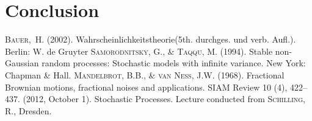 \documentclass[a4paper, twoside, 11pt]{article}
\theoremstyle{definition}
\begin{document}
\newpage

\section{Conclusion}

\newpage

\fancyhead[LO, RE]{}
\begin{thebibliography}{99}
	 \textsc{Bauer,~H.} (2002). Wahrscheinlichkeitstheorie(5th. durchges. und verb. Aufl.). Berlin: W. de Gruyter
	 \textsc{Samorodnitsky, G., \& Taqqu, M.} (1994). Stable non-Gaussian random processes: Stochastic models with infinite variance. New York: Chapman \& Hall.
	 \textsc{Mandelbrot, B.B., \& van Ness, J.W.} (1968). Fractional Brownian motions, fractional noises and applications. SIAM Review 10 (4), 422–437.
	 (2012, October 1). Stochastic Processes. Lecture conducted from \textsc{Schilling, R.}, Dresden.
\end{thebibliography}
\newpage
\end{document}
